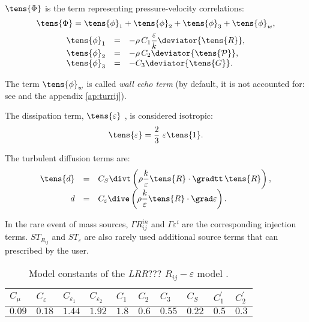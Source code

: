 $\tens{\Phi}$ is the term representing pressure-velocity correlations:
\begin{equation}
\displaystyle \tens{\Phi} = \tens{\phi}_{1}+ \tens{\phi}_{2}+ \tens{\phi}_{3}+ \tens{\phi}_{w},
\end{equation}%
%
\begin{equation}
\begin{array}{r c l}
\tens{\phi}_{1} &=& \displaystyle -\rho \,C_{1}\frac{\varepsilon }{k}%
\deviator{\tens{R}}, \\
\tens{\phi}_{2} &=& -\rho \,C_{2} 
\deviator{\tens{\mathcal{P}}}, \\
\tens{\phi}_{3} &=& -C_{3} \deviator{ \tens{G} }.
\end{array}
\end{equation}

The term $\tens{\phi}_{w}$ is called \emph{wall echo term} (by default, it is not
accounted for: see  and the appendix \ref{ap:turrij}).

The dissipation term, $\tens{\varepsilon}$ , is considered isotropic:
\begin{equation}
\displaystyle \tens{\varepsilon}=\frac{2}{3}\ \varepsilon \tens{1}.
\end{equation}

The turbulent diffusion terms are:
\begin{equation}
\begin{array}{r c l}
\tens{d} & = & C_{S} \displaystyle \divt \left( \rho \frac{k}{\varepsilon }%
\tens{R} \cdot \gradtt \, \tens{R} \right), \\
d & = & C_{\varepsilon }\displaystyle \dive \left( \rho \frac{k}{\varepsilon} 
\tens{R} \cdot \grad \varepsilon \right).
\end{array}
\end{equation}

In the rare event of mass sources, $\Gamma R_{ij}^{in}$ and $\Gamma
\varepsilon ^{i}$ are the corresponding injection terms. $ST_{R_{ij}}$ and $%
ST_{\varepsilon }$ are also rarely used additional source terms that can
prescribed by the user.

\begin{table}[!htp]
\begin{center}
\begin{tabular}{p{}|p{}|p{}|p{}|p{}|p{}|p{}|p{}|p{}|p{}}
$C_\mu$ & $C_{\varepsilon}$ & $C_{\varepsilon_1}$ & $C_{\varepsilon_2}$ & $%
C_1$ & $C_2$ & $C_3$ & $C_S$ & $C^{\prime}_1$ & $C^{\prime}_2$ \\ \hline
$0.09$ & $0.18$ & $1.44$ & $1.92$ & $1.8$ & $0.6$ & $0.55$ & $0.22$ & $0.5$
& $0.3$ 
\end{tabular}
\end{center}
\caption{Model constants of the \emph{LRR}??? $R_{ij}-\varepsilon$ model \cite{Launder:????}.}
\end{table}

